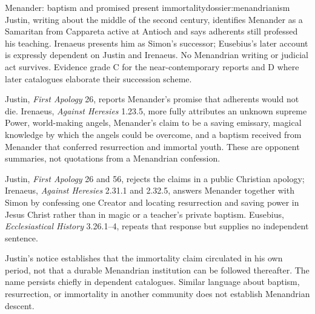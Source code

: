 \begin{heresydossier}{Menander: baptism and promised present immortality}{dossier:menandrianism}
\objectfield Justin, writing about the middle of the second century, identifies Menander as a Samaritan from Cappareta active at Antioch and says adherents still professed his teaching. Irenaeus presents him as Simon's successor; Eusebius's later account is expressly dependent on Justin and Irenaeus. No Menandrian writing or judicial act survives. Evidence grade C for the near-contemporary reports and D where later catalogues elaborate their succession scheme.

\propositionfield Justin, \emph{First Apology} 26, reports Menander's promise that adherents would not die. Irenaeus, \emph{Against Heresies} 1.23.5, more fully attributes an unknown supreme Power, world-making angels, Menander's claim to be a saving emissary, magical knowledge by which the angels could be overcome, and a baptism received from Menander that conferred resurrection and immortal youth. These are opponent summaries, not quotations from a Menandrian confession.

\responsefield Justin, \emph{First Apology} 26 and 56, rejects the claims in a public Christian apology; Irenaeus, \emph{Against Heresies} 2.31.1 and 2.32.5, answers Menander together with Simon by confessing one Creator and locating resurrection and saving power in Jesus Christ rather than in magic or a teacher's private baptism. Eusebius, \emph{Ecclesiastical History} 3.26.1--4, repeats that response but supplies no independent sentence.

\aftermathfield Justin's notice establishes that the immortality claim circulated in his own period, not that a durable Menandrian institution can be followed thereafter. The name persists chiefly in dependent catalogues. Similar language about baptism, resurrection, or immortality in another community does not establish Menandrian descent.
\end{heresydossier}

